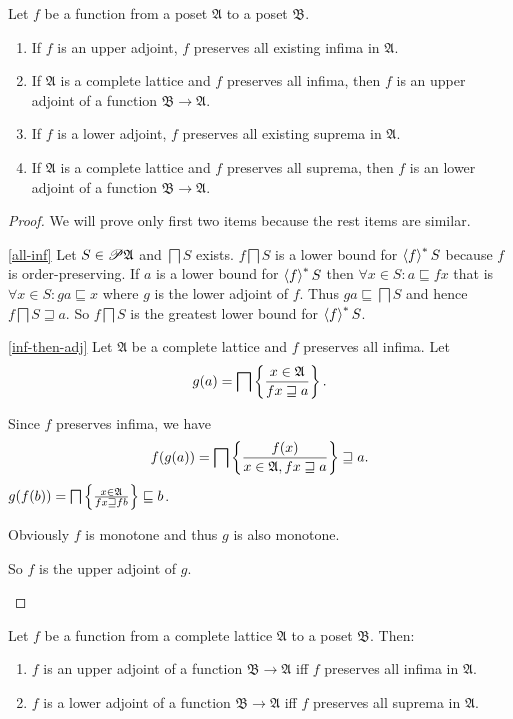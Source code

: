\begin{thm}
Let $f$ be a function from a poset $\mathfrak{A}$ to a poset $\mathfrak{B}$.
\begin{enumerate}
\item \label{all-inf}If $f$ is an upper adjoint, $f$ preserves all existing
infima in $\mathfrak{A}$.
\item \label{inf-then-adj}If $\mathfrak{A}$ is a complete lattice and
$f$ preserves all infima, then $f$ is an upper adjoint of a function
$\mathfrak{B}\rightarrow\mathfrak{A}$.
\item If $f$ is a lower adjoint, $f$ preserves all existing suprema in
$\mathfrak{A}$.
\item If $\mathfrak{A}$ is a complete lattice and $f$ preserves all suprema,
then $f$ is an lower adjoint of a function $\mathfrak{B}\rightarrow\mathfrak{A}$.
\end{enumerate}
\end{thm}
\begin{proof}
We will prove only first two items because the rest items are similar.
\begin{widedisorder}
\item [{\ref{all-inf}}] Let $S\in\mathscr{P}\mathfrak{A}$ and $\bigsqcap S$
exists. $f\bigsqcap S$ is a lower bound for $\left\langle f\right\rangle ^{\ast}S$ because
$f$ is order-preserving. If $a$ is a lower bound for $\left\langle f\right\rangle ^{\ast}S$
then $\forall x\in S:a\sqsubseteq fx$ that is $\forall x\in S:ga\sqsubseteq x$
where $g$ is the lower adjoint of $f$. Thus $ga\sqsubseteq\bigsqcap S$
and hence $f\bigsqcap S\sqsupseteq a$. So $f\bigsqcap S$ is the
greatest lower bound for $\left\langle f\right\rangle ^{\ast}S$.
\item [{\ref{inf-then-adj}}] Let $\mathfrak{A}$ be a complete lattice
and $f$ preserves all infima. Let
\[
g(a)=\bigsqcap\left\{ \frac{x\in\mathfrak{A}}{fx\sqsupseteq a}\right\}.
\]



Since $f$ preserves infima, we have
\[
f(g(a))=\bigsqcap\left\{ \frac{f(x)}{x\in\mathfrak{A},fx\sqsupseteq a}\right\}\sqsupseteq a.
\]
$g(f(b))=\bigsqcap\left\{ \frac{x\in\mathfrak{A}}{fx\sqsupseteq fb}\right\}\sqsubseteq b$.


Obviously $f$ is monotone and thus $g$ is also monotone.


So $f$ is the upper adjoint of $g$.

\end{widedisorder}
\end{proof}
\begin{cor}
Let $f$ be a function from a complete lattice $\mathfrak{A}$ to
a poset $\mathfrak{B}$. Then:
\begin{enumerate}
\item $f$ is an upper adjoint of a function $\mathfrak{B}\rightarrow\mathfrak{A}$
iff $f$ preserves all infima in $\mathfrak{A}$.
\item $f$ is a lower adjoint of a function $\mathfrak{B}\rightarrow\mathfrak{A}$
iff $f$ preserves all suprema in $\mathfrak{A}$.
\end{enumerate}
\end{cor}

